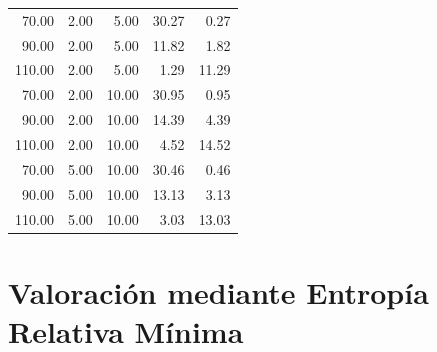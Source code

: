 \begin{table}[H]
\begin{tabular}{@{}rrrrr@{}}
70.00  & 2.00 & 5.00  & 30.27 & 0.27  \\
90.00  & 2.00 & 5.00  & 11.82 & 1.82  \\
110.00 & 2.00 & 5.00  & 1.29  & 11.29 \\
70.00  & 2.00 & 10.00 & 30.95 & 0.95  \\
90.00  & 2.00 & 10.00 & 14.39 & 4.39  \\
110.00 & 2.00 & 10.00 & 4.52  & 14.52 \\
70.00  & 5.00 & 10.00 & 30.46 & 0.46  \\
90.00  & 5.00 & 10.00 & 13.13 & 3.13  \\
110.00 & 5.00 & 10.00 & 3.03  & 13.03 \\
\bottomrule
\end{tabular}
\end{table}

\section{Valoración mediante Entropía Relativa Mínima}

